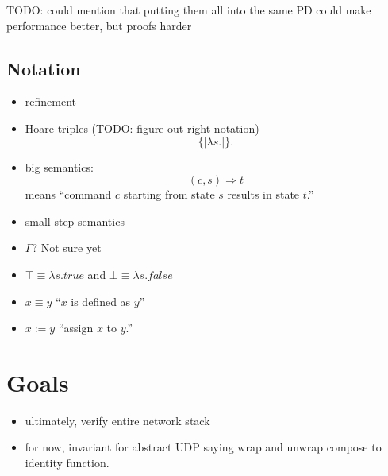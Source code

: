 \documentclass[twoside]{memoir}
\begin{document}
TODO: could mention that putting them all into the same PD could make performance
better, but proofs harder

\subsection{Notation} %
\begin{itemize}
    \item refinement
    \item Hoare triples (TODO: figure out right notation)
        \[
        \{|
            \lambda s. 
        |\}
        .\] 

    \item big semantics:
        \[
            (c,s) \Rightarrow t
        \] 
        means ``command $c$ starting from state $s$ results in state $t$.''
    \item small step semantics
    \item $\Gamma$? Not sure yet
    \item $\top \equiv \lambda s. true$ and $\bot \equiv \lambda s. false$
    \item $x \equiv y$ ``$x$ is defined as $y$''
    \item $x:=y$ ``assign $x$ to $y$.''
\end{itemize}

\section{Goals}
\begin{itemize}
    \item ultimately, verify entire network stack
    \item for now, invariant for abstract UDP saying wrap and unwrap compose to identity function.
\end{itemize}
\end{document}
